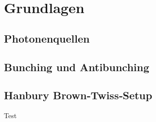 \section{Grundlagen}
\subsection{Photonenquellen}

\subsection{Bunching und Antibunching}

\subsection{Hanbury Brown‐Twiss‐Setup}
Test\cite{brouri}